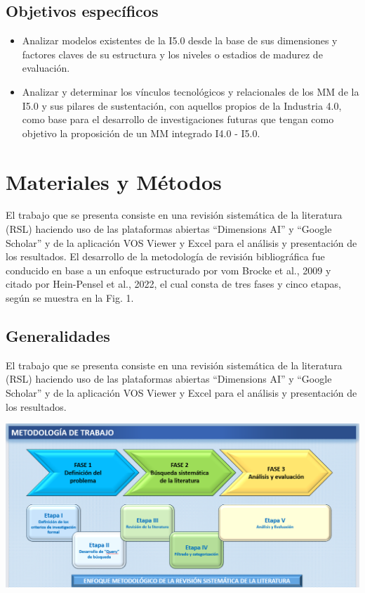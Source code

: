 \documentclass{article}
\begin{document}
\subsection{Objetivos específicos}\label{objetivos-especuxedficos}

\begin{itemize}
\item
  Analizar modelos existentes de la I5.0 desde la base de sus
  dimensiones y factores claves de su estructura y los niveles o
  estadios de madurez de evaluación.
\item
  Analizar y determinar los vínculos tecnológicos y relacionales de los
  MM de la I5.0 y sus pilares de sustentación, con aquellos propios de
  la Industria 4.0, como base para el desarrollo de investigaciones
  futuras que tengan como objetivo la proposición de un MM integrado
  I4.0 - I5.0.
\end{itemize}

\section{Materiales y Métodos}\label{materiales-y-muxe9todos}

El trabajo que se presenta consiste en una revisión sistemática de la
literatura (RSL) haciendo uso de las plataformas abiertas ``Dimensions
AI'' y ``Google Scholar'' y de la aplicación VOS Viewer y Excel para el
análisis y presentación de los resultados. El desarrollo de la
metodología de revisión bibliográfica fue conducido en base a un enfoque
estructurado por vom Brocke et al., 2009 y citado por Hein-Pensel et
al., 2022, el cual consta de tres fases y cinco etapas, según se muestra
en la Fig. 1.

\subsection{Generalidades}\label{generalidades}

El trabajo que se presenta consiste en una revisión sistemática de la
literatura (RSL) haciendo uso de las plataformas abiertas ``Dimensions
AI'' y ``Google Scholar'' y de la aplicación VOS Viewer y Excel para el
análisis y presentación de los resultados.

\includegraphics{images/clipboard-1820455245.png}
\end{document}
